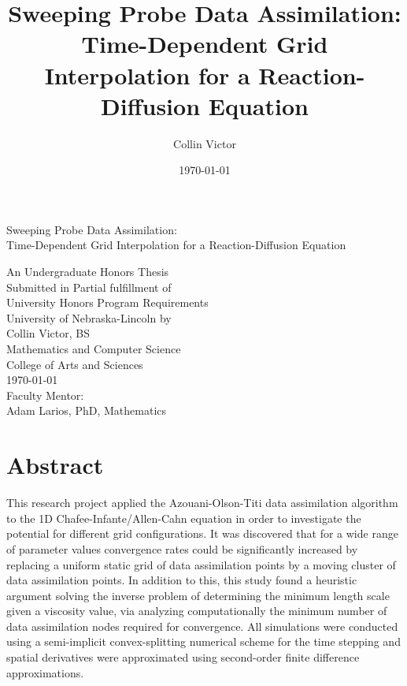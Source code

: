 \documentclass[12pt]{amsart}
\title[Sweeping Probe Data Assimilation]{Sweeping Probe Data Assimilation:\\ Time-Dependent Grid Interpolation for a Reaction-Diffusion Equation}
\date{\today}
\author{Collin Victor}
\date{}
\theoremstyle{plain}
\theoremstyle{definition}
\theoremstyle{remark}
\numberwithin{equation}{section} %
\numberwithin{figure}{section}   %
\begin{document}
	\doublespacing
\begin{titlepage}
	\begin{center}
		\vspace{3cm}\large
	Sweeping Probe Data Assimilation:\\ Time-Dependent Grid Interpolation for a Reaction-Diffusion Equation

		\vspace{3cm}
		\normalsize
		An Undergraduate Honors Thesis\\
		Submitted in Partial fulfillment of\\
		University Honors Program Requirements\\
		University of Nebraska-Lincoln
		\vspace{3cm}
		by\\
	Collin Victor, BS\\
		Mathematics and Computer Science\\
		College of Arts and Sciences\\
\vfill
		\today\\
		\vspace{3cm}
		Faculty Mentor:\\
		Adam Larios, PhD, Mathematics\\
		\vspace*{3cm}
		
		
	\end{center}
\end{titlepage}
\section*{Abstract}\label{abstract}
This research project applied the  Azouani-Olson-Titi data assimilation algorithm to the 1D Chafee-Infante/Allen-Cahn equation in order to investigate the potential for different grid configurations. It was discovered that for a wide range of parameter values convergence rates could be significantly increased by replacing a uniform static grid of data assimilation points by a moving cluster of data assimilation points. In addition to this, this study found a heuristic argument solving the inverse problem of determining the minimum length scale given a viscosity value, via analyzing computationally the minimum number of data assimilation nodes required for convergence. All simulations were conducted using a semi-implicit convex-splitting numerical scheme for the time stepping and spatial derivatives were approximated using second-order finite difference approximations. 
\end{document}
